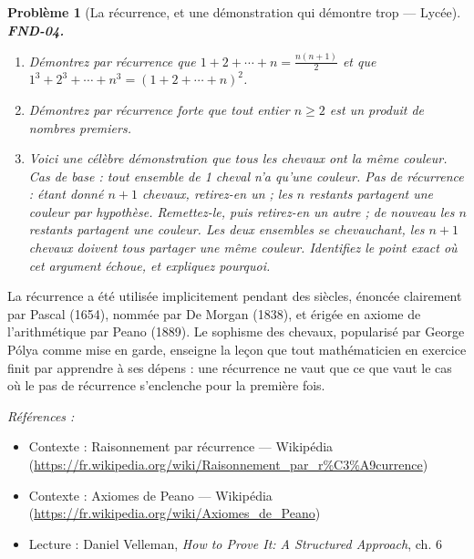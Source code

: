 \documentclass[11pt]{article}
\newtheorem{problem}{Problème}
\newenvironment{refs}{\par\small\noindent\emph{Références :}\begin{itemize}\setlength\itemsep{0pt}}{\end{itemize}\normalsize}
\begin{document}
\begin{problem}[{La récurrence, et une démonstration qui démontre trop --- Lycée}]
\textbf{FND-04.} \begin{enumerate}
\item[(a)] Démontrez par récurrence que
$ 1 + 2 + \cdots + n = \frac{n(n+1)}{2} $ et que
$ 1^3 + 2^3 + \cdots + n^3 = (1 + 2 + \cdots + n)^2 $.
\item[(b)] Démontrez par récurrence forte que
tout entier $ n \ge 2 $ est un produit de nombres premiers.
\item[(c)] Voici une célèbre \og{} démonstration \fg{} que tous
les chevaux ont la même couleur. \textit{Cas de base :} tout ensemble de 1 cheval n'a qu'une couleur.
\textit{Pas de récurrence :} étant donné $ n+1 $ chevaux, retirez-en un ; les $ n $ restants
partagent une couleur par hypothèse. Remettez-le, puis retirez-en un autre ; de nouveau les $ n $
restants partagent une couleur. Les deux ensembles se chevauchant, les $ n+1 $ chevaux doivent
tous partager une même couleur. Identifiez le point exact où cet argument échoue, et expliquez
pourquoi.
\end{enumerate}

\end{problem}

\noindent La récurrence a été utilisée implicitement pendant des siècles, énoncée
clairement par Pascal (1654), nommée par De Morgan (1838), et érigée en axiome de l'arithmétique
par Peano (1889). Le sophisme des chevaux, popularisé par George Pólya comme mise en garde,
enseigne la leçon que tout mathématicien en exercice finit par apprendre à ses dépens : une
récurrence ne vaut que ce que vaut le cas où le pas de récurrence s'enclenche pour la première
fois.

\begin{refs}
\item Contexte : Raisonnement par récurrence --- Wikipédia (\url{https://fr.wikipedia.org/wiki/Raisonnement_par_r%C3%A9currence})
\item Contexte : Axiomes de Peano --- Wikipédia (\url{https://fr.wikipedia.org/wiki/Axiomes_de_Peano})
\item Lecture : Daniel Velleman, \textit{How to Prove It: A Structured Approach}, ch. 6
\end{refs}

\bigskip
\end{document}
